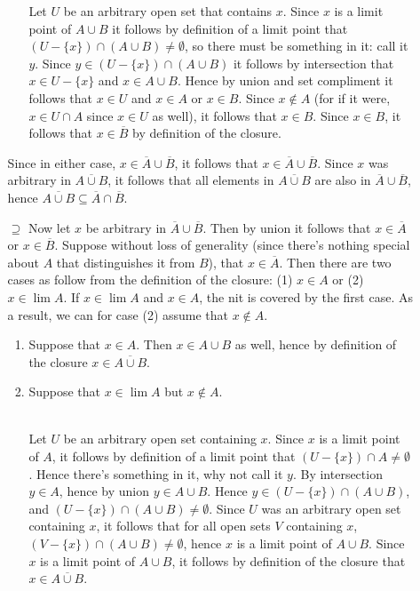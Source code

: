 \documentclass{article}
\begin{document}
\begin{enumerate}
\begin{itemize}
\begin{enumerate}
            
            Let $U$ be an arbitrary open set that contains $x$. Since $x$ is a limit point of $A\cup B$ it follows by definition of a limit point that $(U - \{x\})\cap (A\cup B)\ne \emptyset$, so there must be something in it: call it $y$. Since $y\in (U-\{x\})\cap (A\cup B)$ it follows by intersection that $x\in U-\{x\}$ and $x\in A\cup B$. Hence by union and set compliment it follows that $x\in U$ and $x\in A$ or $x\in B$. Since $x\not\in A$ (for if it were, $x\in U\cap A$ since $x\in U$ as well), it follows that $x\in B$. Since $x\in B$, it follows that $x\in \overline{B}$ by definition of the closure. 
        \end{enumerate}
        Since in either case, $x\in \overline{A}\cup \overline{B}$, it follows that $x\in \overline{A}\cup \overline{B}$. Since $x$ was arbitrary in $\overline{A\cup B}$, it follows that all elements in $\overline{A\cup B}$ are also in $\overline{A}\cup \overline{B}$, hence $\overline{A\cup B} \subseteq \overline{A}\cap \overline{B}$.
        \item[$\supseteq$] Now let $x$ be arbitrary in $\overline{A}\cup \overline{B}$. Then by union it follows that $x\in \overline{A}$ or $x\in \overline{B}$. Suppose without loss of generality (since there's nothing special about $A$ that distinguishes it from $B$), that $x\in \overline{A}$. Then there are two cases as follow from the definition of the closure: (1) $x\in A$ or (2) $x\in \lim A$. If $x\in \lim A$ and $x\in A$, the nit is covered by the first case. As a result, we can for case (2) assume that $x\not\in A$.
        \begin{enumerate}
            \item Suppose that $x\in A$. Then $x\in A\cup B$ as well, hence by definition of the closure $x\in \overline{A\cup B}$.
            \item Suppose that $x\in \lim A$ but $x\not\in A$. 
            
            \\Let $U$ be an arbitrary open set containing $x$. Since $x$ is a limit point of $A$, it follows by definition of a limit point that $(U-\{x\})\cap A\ne \emptyset$. Hence there's something in it, why not call it $y$. By intersection $y\in A$, hence by union $y\in A\cup B$. Hence $y\in (U-\{x\})\cap (A\cup B)$, and $ (U-\{x\})\cap (A\cup B) \ne \emptyset$. Since $U$ was an arbitrary open set containing $x$, it follows that for all open sets $V$ containing $x$, $(V-\{x\})\cap (A\cup B) \ne \emptyset$, hence $x$ is a limit point of $A\cup B$. Since $x$ is a limit point of $A\cup B$, it follows by definition of the closure that $x\in \overline{A\cup B}$.
            

\end{enumerate}
\end{itemize}
\end{enumerate}
\end{document}
